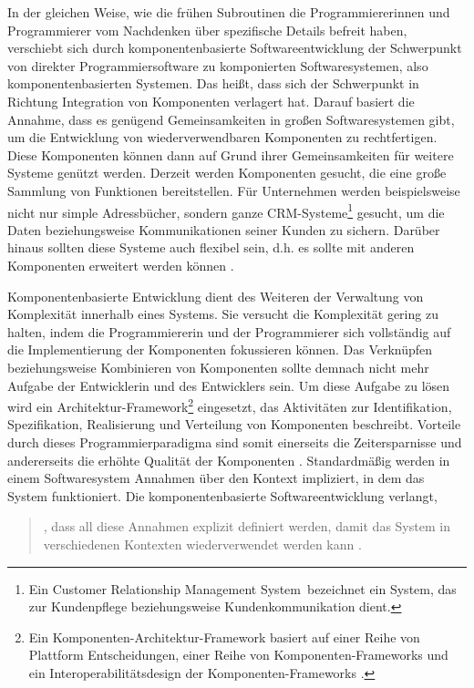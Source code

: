 In der gleichen Weise, wie die frühen Subroutinen die Programmiererinnen und Programmierer vom Nachdenken über spezifische Details befreit haben, verschiebt sich durch komponentenbasierte Softwareentwicklung der Schwerpunkt von direkter Programmiersoftware zu komponierten Softwaresystemen, also komponentenbasierten Systemen. Das heißt, dass sich der Schwerpunkt in Richtung Integration von Komponenten verlagert hat. Darauf basiert die Annahme, dass es genügend Gemeinsamkeiten in großen Softwaresystemen gibt, um die Entwicklung von wiederverwendbaren Komponenten zu rechtfertigen. Diese Komponenten können dann auf Grund ihrer Gemeinsamkeiten für weitere Systeme genützt werden. Derzeit werden Komponenten gesucht, die eine große Sammlung von Funktionen bereitstellen. Für Unternehmen werden beispielsweise nicht nur simple Adressbücher, sondern ganze CRM-Systeme\footnote{Ein \glqq Customer Relationship Management System\grqq\ bezeichnet ein System, das zur Kundenpflege beziehungsweise Kundenkommunikation dient.} gesucht, um die Daten beziehungsweise Kommunikationen seiner Kunden zu sichern. Darüber hinaus sollten diese Systeme auch flexibel sein, d.h. es sollte mit anderen Komponenten erweitert werden können \citereset \autocite[siehe][S. 17-25]{Andresen.2003}.

Komponentenbasierte Entwicklung dient des Weiteren der Verwaltung von Komplexität innerhalb eines Systems. Sie versucht die Komplexität gering zu halten, indem die Programmiererin und der Programmierer sich vollständig auf die Implementierung der Komponenten fokussieren können. Das Verknüpfen beziehungsweise Kombinieren von Komponenten sollte demnach nicht mehr Aufgabe der Entwicklerin und des Entwicklers sein. Um diese Aufgabe zu lösen wird ein Architektur-Framework\footnote{Ein Komponenten-Architektur-Framework basiert auf einer Reihe von Plattform Entscheidungen, einer Reihe von Komponenten-Frameworks und ein Interoperabilitätsdesign der Komponenten-Frameworks \citereset \autocite[siehe][419-422]{Szyperski.2002}.} eingesetzt, das Aktivitäten zur Identifikation, Spezifikation, Realisierung und Verteilung von Komponenten beschreibt. Vorteile durch dieses Programmierparadigma sind somit einerseits die Zeitersparnisse und andererseits die erhöhte Qualität der Komponenten \citereset \autocite[siehe][S. 1-3]{Andresen.2003}. Standardmäßig werden in einem Softwaresystem Annahmen über den Kontext impliziert, in dem das System funktioniert. Die komponentenbasierte Softwareentwicklung verlangt,
\begin{quote}
  \glqq[\dots], dass all diese Annahmen explizit definiert werden, damit das System in verschiedenen Kontexten wiederverwendet werden kann \citereset \autocite[siehe][]{Andresen.2003}.\grqq
\end{quote}

